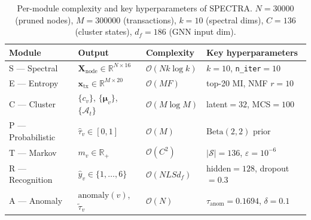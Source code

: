\documentclass[journal]{IEEEtran}
\begin{document}
\begin{table}[t]
  \caption{Per-module complexity and key hyperparameters of \textsc{SPECTRA}.
           $N=\num{30000}$ (pruned nodes), $M=\num{300000}$ (transactions),
           $k=10$ (spectral dims), $C=136$ (cluster states),
           $d_f=186$ (GNN input dim).}
  \label{tab:module_summary}
  \centering
  \renewcommand{\arraystretch}{1.15}
  \begin{tabular}{@{}lllp{3.6cm}@{}}
    \toprule
    \textbf{Module} & \textbf{Output} & \textbf{Complexity} & \textbf{Key hyperparameters} \\
    \midrule
    S — Spectral  & $\mathbf{X}_{\mathrm{node}} \!\in\! \mathbb{R}^{N\times 16}$
                  & $\mathcal{O}(Nk\log k)$
                  & $k{=}10$, \texttt{n\_iter}$=10$ \\
    E — Entropy   & $\mathbf{x}_{\mathrm{tx}} \!\in\! \mathbb{R}^{M\times 20}$
                  & $\mathcal{O}(MF)$
                  & top-20 MI, NMF $r{=}10$ \\
    C — Cluster   & $\{c_v\}$, $\{\boldsymbol{\mu}_v\}$, $\{\mathcal{A}_t\}$
                  & $\mathcal{O}(M\log M)$
                  & latent$=32$, MCS$=100$ \\
    P — Probabilistic & $\hat{\tau}_v \!\in\! [0,1]$
                  & $\mathcal{O}(M)$
                  & $\mathrm{Beta}(2,2)$ prior \\
    T — Markov    & $m_v \!\in\! \mathbb{R}_{+}$
                  & $\mathcal{O}(C^2)$
                  & $|\mathcal{S}|{=}136$, $\varepsilon{=}10^{-6}$ \\
    R — Recognition & $\hat{y}_v \!\in\! \{1,\ldots,6\}$
                  & $\mathcal{O}(NLSd_f)$
                  & hidden$=128$, dropout$=0.3$ \\
    A — Anomaly   & $\mathrm{anomaly}(v)$, $\tilde{\tau}_v$
                  & $\mathcal{O}(N)$
                  & $\tau_{\mathrm{anom}}{=}0.1694$, $\delta{=}0.1$ \\
    \bottomrule
  \end{tabular}
\end{table}
\end{document}
